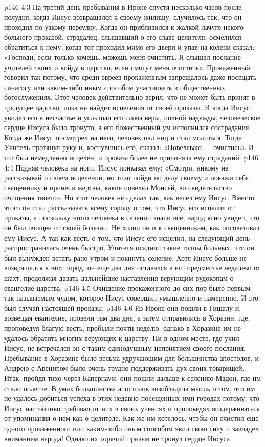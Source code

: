 \vs p146 4:3 \pc На третий день пребывания в Ироне спустя несколько часов после полудня, когда Иисус возвращался к своему жилищу, случилось так, что он проходил по узкому переулку. Когда он приблизился к жалкой лачуге некого больного проказой, страдалец, слышавший о его славе целителя, осмелился обратиться к нему, когда тот проходил мимо его двери и упав на колени сказал: «Господи, если только хочешь, можешь меня очистить. Я слышал послание учителей твоих и войду в царство, если смогут меня очистить». Прокаженный говорил так потому, что среди евреев прокаженным запрещалось даже посещать синагогу или каким\hyp{}либо иным способом участвовать в общественных богослужениях. Этот человек действительно верил, что не может быть принят в грядущее царство, пока не найдет исцеления от своей проказы. И когда Иисус увидел его в несчастье и услышал его слова веры, полной надежды, человеческое сердце Иисуса было тронуто, а его божественный ум исполнился сострадания. Когда же Иисус посмотрел на него, человек пал ниц и стал молиться. Тогда Учитель протянул руку и, коснувшись его, сказал: «Повелеваю --- очистись». И тот был немедленно исцелен; и проказа более не причиняла ему страданий.
\vs p146 4:4 Подняв человека на ноги, Иисус приказал ему: «Смотри, никому не рассказывай о своем исцелении, но тихо пойди по делу своему и покажи себя священнику и принеси жертвы, какие повелел Моисей, во свидетельство очищения твоего». Но этот человек не сделал так, как велел ему Иисус. Вместо этого он стал рассказывать всему городу о том, что Иисус его исцелил от проказы, а поскольку этого человека в селении знали все, народ ясно увидел, что он был очищен от своей болезни. Не ходил он и к священникам, как посоветовал ему Иисус. А так как весть о том, что Иисус его исцелил, на следующий день распространилась очень быстро, Учителя осадили такие толпы больных, что он был вынужден встать рано утром и покинуть селение. Хотя Иисус больше не возвращался в этот город, он еще два дня оставался в его предместье недалеко от шахт, продолжая давать дальнейшие наставления верующим рудокопам о евангелие царства.
\vs p146 4:5 Очищение прокаженного до сих пор было первым так называемым чудом, которое Иисус совершил умышленно и намеренно. И это был случай настоящей проказы.
\vs p146 4:6 \pc Из Ирона они пошли в Гишалу и, возвещая евангелие, провели там два дня, а затем отправились в Хоразин, где, проповедуя благую весть, пробыли почти неделю; однако в Хоразине им не удалось обратить многих верующих к царству. Ни в одном месте, где учил Иисус, не встречался он с таким единодушным неприятием своего послания. Пребывание в Хоразине было весьма удручающим для большинства апостолов, и Андрею с Авениром было очень трудно поддерживать дух своих товарищей. Итак, пройдя тихо через Капернаум, они пошли дальше к селению Мадон, где им стало полегче. В умах большинства апостолов возобладала мысль о том, что им не удалось добиться успеха в этих недавно посещенных ими городах потому, что Иисус настойчиво требовал от них в своих учениях и проповедях воздерживаться от упоминания о нем как о целителе. Как же им хотелось, чтобы он очистил еще одного прокаженного или каким\hyp{}либо иным способом явил свою силу и завладел вниманием народа! Однако их горячий призыв не тронул сердце Иисуса.
